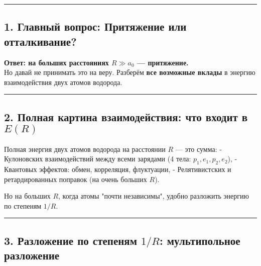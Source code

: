 \documentclass[11pt]{article}
\begin{document}
\begin{center}\rule{0.5\linewidth}{\linethickness}\end{center}

\subsection{\texorpdfstring{1. Главный вопрос: \textbf{Притяжение или
отталкивание?}}{1. Главный вопрос: Притяжение или отталкивание?}}\label{ux433ux43bux430ux432ux43dux44bux439-ux432ux43eux43fux440ux43eux441-ux43fux440ux438ux442ux44fux436ux435ux43dux438ux435-ux438ux43bux438-ux43eux442ux442ux430ux43bux43aux438ux432ux430ux43dux438ux435}

\textbf{Ответ: на больших расстояниях \(R \gg a_0\) --- притяжение.}\\
Но давай не принимать это на веру. Разберём \textbf{все возможные
вклады} в энергию взаимодействия двух атомов водорода.

\begin{center}\rule{0.5\linewidth}{\linethickness}\end{center}

\subsection{\texorpdfstring{2. Полная картина взаимодействия: что входит
в
\(E(R)\)}{2. Полная картина взаимодействия: что входит в E(R)}}\label{ux43fux43eux43bux43dux430ux44f-ux43aux430ux440ux442ux438ux43dux430-ux432ux437ux430ux438ux43cux43eux434ux435ux439ux441ux442ux432ux438ux44f-ux447ux442ux43e-ux432ux445ux43eux434ux438ux442-ux432-er}

Полная энергия двух атомов водорода на расстоянии \(R\) --- это сумма: -
Кулоновских взаимодействий между всеми зарядами (4 тела:
\(p_1, e_1, p_2, e_2\)), - Квантовых эффектов: обмен, корреляция,
флуктуации, - Релятивистских и ретардированных поправок (на очень
больших \(R\)).

Но на больших \(R\), когда атомы "почти независимы", удобно разложить
энергию по степеням \(1/R\).

\begin{center}\rule{0.5\linewidth}{\linethickness}\end{center}

\subsection{\texorpdfstring{3. Разложение по степеням \(1/R\):
мультипольное
разложение}{3. Разложение по степеням 1/R: мультипольное разложение}}\label{ux440ux430ux437ux43bux43eux436ux435ux43dux438ux435-ux43fux43e-ux441ux442ux435ux43fux435ux43dux44fux43c-1r-ux43cux443ux43bux44cux442ux438ux43fux43eux43bux44cux43dux43eux435-ux440ux430ux437ux43bux43eux436ux435ux43dux438ux435}
\end{document}
